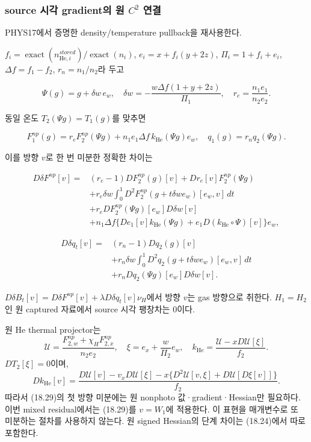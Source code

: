 \hypertarget{source-uxc2dcuxac01-gradientuxc758-uxc6d0-c2-uxc5f0uxacb0}{%
\subsubsection{\texorpdfstring{source 시각 gradient의 원 \(C^2\)
연결}{source 시각 gradient의 원 C\^{}2 연결}}\label{source-uxc2dcuxac01-gradientuxc758-uxc6d0-c2-uxc5f0uxacb0}}

PHYS17에서 증명한 density/temperature pullback을 재사용한다.\par

\(f_i=\operatorname{exact}(n_{\mathrm{He},i}^{stored})/\operatorname{exact}(n_i)\),
\(e_i=x+f_i(y+2z)\), \(\Pi_i=1+f_i+e_i\), \(\Delta f=f_1-f_2\),
\(r_n=n_1/n_2\)라 두고

\[
\Psi(g)=g+\delta w\,e_w,\quad
\delta w=-\frac{w\Delta f(1+y+2z)}{\Pi_1},
\quad r_e=\frac{n_1e_1}{n_2e_2}.
\tag{18.27}
\]

동일 온도 \(T_2(\Psi g)=T_1(g)\)를 맞추면

\[
F_1^{np}(g)
=r_eF_2^{np}(\Psi g)
+n_1e_1\Delta f\,k_{\mathrm{He}}(\Psi g)e_w,\quad
q_1(g)=r_nq_2(\Psi g).
\tag{18.28}
\]

이를 방향 \(v\)로 한 번 미분한 정확한 차이는

\[
\begin{aligned}
D\delta F^{np}[v]
={}&(r_e-1)DF_2^{np}(g)[v]+Dr_e[v]F_2^{np}(\Psi g)\\
&+r_e\delta w\int_0^1D^2F_2^{np}(g+t\delta w e_w)[e_w,v]\,dt\\
&+r_eDF_2^{np}(\Psi g)[e_w]D\delta w[v]\\
&+n_1\Delta f\{De_1[v]k_{\mathrm{He}}(\Psi g)
+e_1D(k_{\mathrm{He}}\circ\Psi)[v]\}e_w,
\end{aligned}
\tag{18.29}
\]

\[
\begin{aligned}
D\delta q_t[v]
={}&(r_n-1)Dq_2(g)[v]\\
&+r_n\delta w\int_0^1D^2q_2(g+t\delta w e_w)[e_w,v]\,dt\\
&+r_nDq_2(\Psi g)[e_w]D\delta w[v].
\end{aligned}
\tag{18.30}
\]

\(D\delta B_t[v]=D\delta F^{np}[v]+\lambda D\delta q_t[v]\nu_H\)에서
방향 \(v\)는 gas 방향으로 취한다. \(H_1=H_2\)인 원 captured 자료에서
source 시각 팽창차는 0이다.

원 He thermal projector는 \[
\mathscr U=\frac{F_{2,w}^{np}+\chi_HF_{2,x}^{np}}{n_2e_2},
\quad \xi=e_x+\frac{w}{\Pi_2}e_w,\quad
k_{\mathrm{He}}=\frac{\mathscr U-xD\mathscr U[\xi]}{f_2}.
\tag{18.31}
\] \(DT_2[\xi]=0\)이며, \[
Dk_{\mathrm{He}}[v]
=\frac{D\mathscr U[v]-v_xD\mathscr U[\xi]
-x\{D^2\mathscr U[v,\xi]+D\mathscr U[D\xi[v]]\}}{f_2}.
\tag{18.32}
\] 따라서 (18.29)의 첫 방향 미분에는 원 nonphoto 값·gradient·Hessian만
필요하다. 이번 mixed residual에서는 (18.29)를 \(v=W_1\)에 적용한다. 이
표현을 매개변수로 또 미분하는 절차를 사용하지 않는다. 원 signed
Hessian의 단계 차이는 (18.24)에서 따로 포함한다.

